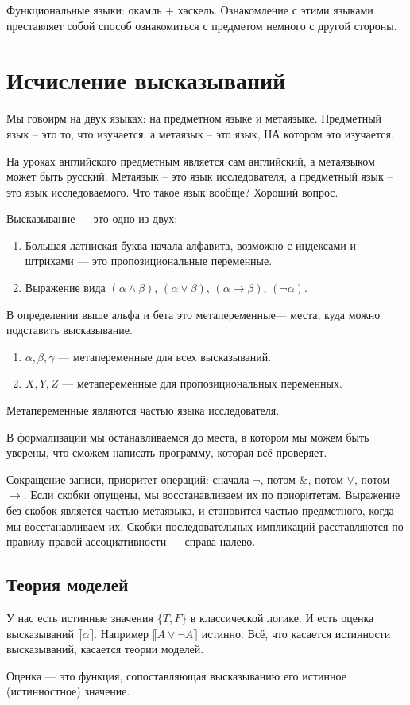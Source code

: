 Функциональные языки: окамль + хаскель.
Ознакомление с этими языками преставляет собой способ ознакомиться с предметом немного с другой стороны.

\section{Исчисление высказываний}
Мы говоирм на двух языках: на предметном языке и метаязыке.
Предметный язык -- это то, что изучается, а метаязык -- это язык, НА котором это изучается.

На уроках английского предметным является сам английский, а метаязыком может быть русский.
Метаязык -- это язык исследователя, а предметный язык -- это язык исследоваемого.
Что такое язык вообще? Хороший вопрос.

Высказывание --- это одно из двух:
\begin{enumerate}
\item Большая латниская буква начала алфавита, возможно с индексами и штрихами --- это пропозициональные переменные.
\item Выражение вида $(\alpha \land \beta)$, $(\alpha \lor \beta)$, $(\alpha \to \beta)$, $(\neg \alpha)$.
\end{enumerate}

В определении выше альфа и бета это метапеременные--- места, куда можно подставить высказывание.
\begin{enumerate}
\item $\alpha, \beta, \gamma$ --- метапеременные для всех высказываний.
\item $X, Y, Z$ --- метапеременные для пропозициональных переменных.
\end{enumerate}

Метапеременные являются частью языка исследователя.

В формализации мы останавливаемся до места, в котором мы можем быть уверены, что сможем написать программу, которая всё проверяет.

Сокращение записи, приоритет операций: сначала $\neg$, потом $\&$, потом $\vee$, потом $\to$.
Если скобки опущены, мы восстанавливаем их по приоритетам.
Выражение без скобок является частью метаязыка, и становится частью предметного, когда мы восстанавливаем их.
Скобки последовательных импликаций расставляются по правилу правой ассоциативности --- справа налево.
\subsection{Теория моделей}
У нас есть истинные значения $\{T, F\}$ в классической логике.
И есть оценка высказываний $\llbracket \alpha\rrbracket$.
Например $\llbracket A \lor \neg A\rrbracket$ истинно.
Всё, что касается истинности высказываний, касается теории моделей.
\begin{definition}
    Оценка --- это функция, сопоставляющая высказыванию его истинное (истинностное) значение.
\end{definition}
